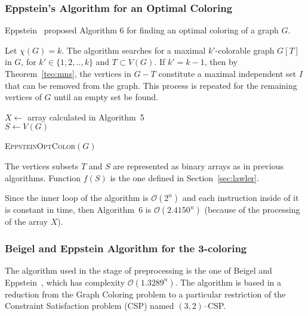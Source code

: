 \documentclass[fleqn,10pt]{SelfArx} %
\newcommand{\cO}{\mathcal{O}}
\begin{document}
	\subsubsection{Eppstein's Algorithm for an Optimal Coloring} Eppstein~\cite{Eppstein03} proposed Algorithm 6 for finding an optimal coloring of a graph $G$.
	
	Let $\chi(G)=k$. The algorithm searches for a maximal $k'$-colorable graph $G[T]$ in $G$, for $k' \in \{1,2,..,k\}$ and $T \subset V(G)$. If $k' = k-1$, then by Theorem~\ref{teo:mns}, the vertices in $G-T$ constitute a maximal independent set $I$ that can be removed from the graph. This process is repeated for the remaining vertices of $G$ until an empty set be found. 
	
	\begin{algorithm}[h]
		\SetAlgoNoLine
		$X \gets$ array calculated in Algorithm~5\\
		$S \gets V(G)$\\
		\caption{\textsc{EppsteinOptColor$(G)$}}\label{alg:optc}
	\end{algorithm}
	
	The vertices subsets $T$ and $S$ are represented as binary arrays as in previous algorithms. Function $f(S)$ is the one defined in Section~\ref{sec:lawler}.
	
	Since the inner loop of the algorithm is $\cO(2^n)$ and each instruction inside of it is constant in time, then Algorithm~6 is $\cO(2.4150^n)$ (because of the processing of the array $X$).
	
	\subsubsection{Beigel and Eppstein Algorithm for the 3-coloring}
	
	The algorithm used in the stage of preprocessing is the one
	of Beigel and Eppstein~\cite{BeigelEppstein05}, which has complexity $\cO(1.3289^n)$. The algorithm is based in a reduction from the Graph Coloring problem to a particular restriction of the Constraint Satisfaction problem
	(CSP) named $(3,2)$--CSP.
	
\end{document}
